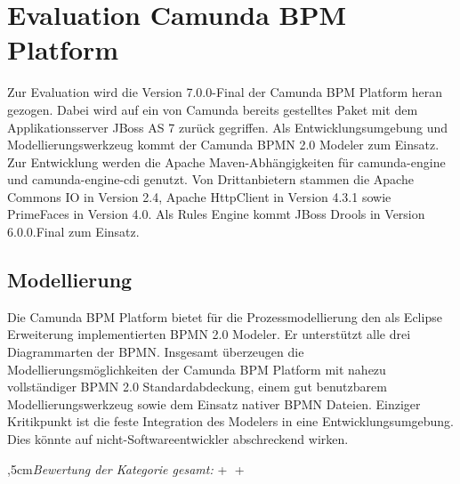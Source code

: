 \section{Evaluation Camunda BPM Platform}
\label{evaluationCamunda}
Zur Evaluation wird die Version 7.0.0-Final der Camunda BPM Platform heran gezogen. Dabei wird auf ein von Camunda bereits gestelltes Paket mit dem Applikationsserver JBoss AS 7 zurück gegriffen. Als Entwicklungsumgebung und Modellierungswerkzeug kommt der Camunda BPMN 2.0 Modeler zum Einsatz. 
Zur Entwicklung werden die Apache Maven-Abhängigkeiten für camunda-engine und camunda-engine-cdi genutzt.
Von Drittanbietern stammen die Apache Commons IO in Version 2.4, Apache HttpClient in Version 4.3.1 sowie PrimeFaces in Version 4.0.
\newline Als Rules Engine kommt JBoss Drools in Version 6.0.0.Final zum Einsatz.

\subsection{Modellierung}

Die Camunda BPM Platform bietet für die Prozessmodellierung den als Eclipse Erweiterung implementierten \ac{BPMN} 2.0 Modeler. Er unterstützt alle drei Diagrammarten der \ac{BPMN}. Insgesamt überzeugen die Modellierungsmöglichkeiten der Camunda BPM Platform mit nahezu vollständiger \ac{BPMN} 2.0 Standardabdeckung, einem gut benutzbarem Modellierungswerkzeug sowie dem Einsatz nativer \ac{BPMN} Dateien. Einziger Kritikpunkt ist die feste Integration des Modelers in eine Entwicklungsumgebung. Dies könnte auf nicht-Softwareentwickler abschreckend wirken. 

\bigskip{},5cm\textit{Bewertung der Kategorie gesamt:} \hspace{5mm} \textcircled{+} \textcircled{+}
\leftskip=0cm

